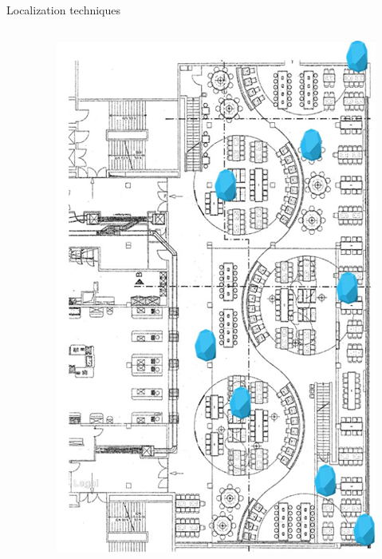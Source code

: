 \documentclass[11pt]{beamer}
\begin{document}
\begin{frame}{Localization techniques}
\begin{columns}
\begin{column}{0.65\textwidth}
    \end{column}

    \hfill
    \begin{column}{0.25\textwidth}
      \includegraphics[width=\textwidth]{beaconfunctionality}
    \end{column}

  \end{columns}

\end{frame}
\end{document}
